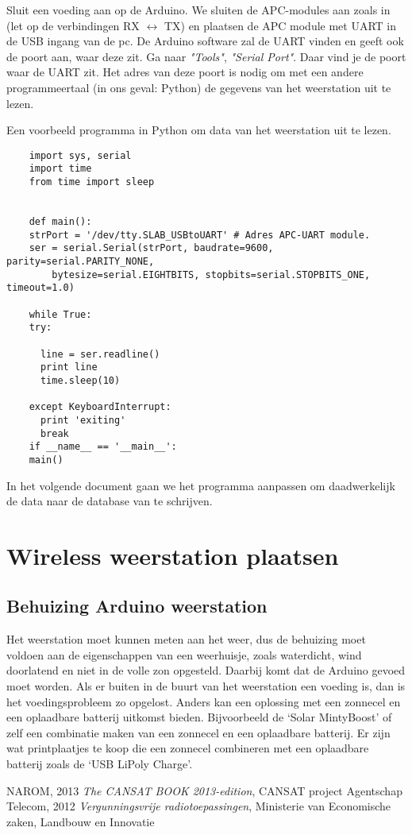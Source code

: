 Sluit een voeding aan op de Arduino.
We sluiten de APC-modules aan zoals in  (let op de
verbindingen RX $\longleftrightarrow$ TX) en plaatsen de APC module met UART
in de USB ingang van de pc. De Arduino software zal de UART vinden en
geeft ook de poort aan, waar deze zit. Ga naar \emph {"Tools"},
\emph{"Serial Port"}. Daar vind je de poort waar de UART  zit. Het adres
van deze poort is nodig om met een andere programmeertaal (in ons
geval: Python) de gegevens van het weerstation uit te lezen.  

Een voorbeeld programma in Python om data van het weerstation uit te lezen.

\begin{verbatim}
    import sys, serial
    import time
    from time import sleep
   
    
    def main():
    strPort = '/dev/tty.SLAB_USBtoUART' # Adres APC-UART module.
    ser = serial.Serial(strPort, baudrate=9600, parity=serial.PARITY_NONE, 
        bytesize=serial.EIGHTBITS, stopbits=serial.STOPBITS_ONE, timeout=1.0)
    
    while True:
    try:

      line = ser.readline()
      print line
      time.sleep(10)
 
    except KeyboardInterrupt:
      print 'exiting'
      break
    if __name__ == '__main__':
    main()
\end{verbatim}

In het volgende document gaan we het programma aanpassen om daadwerkelijk de 
data naar de database van \hisparc te schrijven.

\section{Wireless weerstation plaatsen}

\subsection{Behuizing Arduino weerstation} Het weerstation moet kunnen
meten aan het weer, dus de behuizing moet voldoen aan de eigenschappen
van een weerhuisje, zoals waterdicht, wind doorlatend en niet in de
volle zon opgesteld. Daarbij komt dat de Arduino gevoed moet worden. Als
er buiten in de buurt van het weerstation een voeding is, dan is het
voedingsprobleem zo opgelost. Anders kan een oplossing met een zonnecel
en een oplaadbare batterij uitkomst bieden. Bijvoorbeeld de `Solar
MintyBoost' of zelf een combinatie maken van een zonnecel en een
oplaadbare batterij. Er zijn wat printplaatjes te koop die een zonnecel
combineren met een oplaadbare batterij zoals de `USB LiPoly Charge'.

  


 
\begin{thebibliography}{9}
        NAROM, 2013 \emph{The CANSAT BOOK 2013-edition}, 
        CANSAT project
    Agentschap Telecom, 2012 \emph{Vergunningsvrije radiotoepassingen}, 
    Ministerie van Economische zaken, Landbouw en Innovatie
\end{thebibliography}



